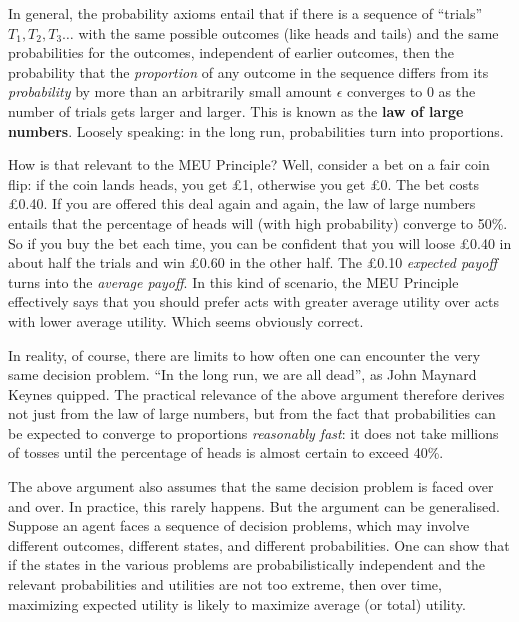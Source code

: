 In general, the probability axioms entail that if there is a sequence
of ``trials'' $T_1,T_2,T_3\ldots$ with the same possible outcomes
(like heads and tails) and the same probabilities for the outcomes,
independent of earlier outcomes, then the probability that the
\emph{proportion} of any outcome in the sequence differs from its
\emph{probability} by more than an arbitrarily small amount $\epsilon$
converges to 0 as the number of trials gets larger and larger. This is
known as the \textbf{law of large numbers}. Loosely speaking: in the
long run, probabilities turn into proportions.

How is that relevant to the MEU Principle? Well, consider a bet on a
fair coin flip: if the coin lands heads, you get £1, otherwise you get
£0. The bet costs £0.40. If you are offered this deal again and again,
the law of large numbers entails that the percentage of heads will
(with high probability) converge to 50\%. So if you buy the bet each
time, you can be confident that you will loose £0.40 in about half the
trials and win £0.60 in the other half. The £0.10 \emph{expected
  payoff} turns into the \emph{average payoff}. In this kind of
scenario, the MEU Principle effectively says that you should prefer
acts with greater average utility over acts with lower average
utility. Which seems obviously correct.

In reality, of course, there are limits to how often one can encounter
the very same decision problem. ``In the long run, we are all dead'',
as John Maynard Keynes quipped. The practical relevance of the above
argument therefore derives not just from the law of large numbers, but
from the fact that probabilities can be expected to converge to
proportions \emph{reasonably fast}: it does not take millions of
tosses until the percentage of heads is almost certain to exceed 40\%.

The above argument also assumes that the same decision problem is faced over and
over. In practice, this rarely happens. But the argument can be generalised.
Suppose an agent faces a sequence of decision problems, which may involve
different outcomes, different states, and different probabilities. One can show
that if the states in the various problems are probabilistically independent and
the relevant probabilities and utilities are not too extreme, then over time,
maximizing expected utility is likely to maximize average (or total) utility.


